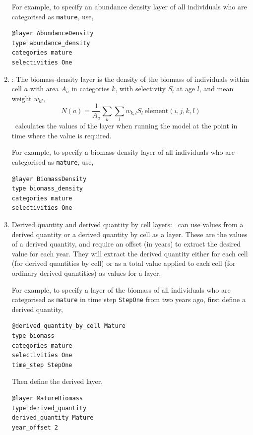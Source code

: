 \begin{enumerate}
For example, to specify an abundance density layer of all individuals who are categorised as \texttt{mature}, use,
{\small{\begin{verbatim}
@layer AbundanceDensity
type abundance_density
categories mature
selectivities One
\end{verbatim}}}

\item {}: The biomass-density layer is the density of the biomass of individuals within cell $a$ with area $A_a$ in categories $k$, with selectivity $S_l$ at age $l$, and mean weight $w_{kl}$,
\begin{equation}
  N(a) = \frac{1}{A_a} \sum\limits_{k} \sum\limits_l w_{k,l} S_l \ \text{element}(i,j,k,l)
\end{equation}
\SPM\ calculates the values of the layer when running the model at the point in time where the value is required.

For example, to specify a biomass density layer of all individuals who are categorised as \texttt{mature}, use,
{\small{\begin{verbatim}
@layer BiomassDensity
type biomass_density
categories mature
selectivities One
\end{verbatim}}}

\item {Derived quantity and derived quantity by cell layers}\label{derived quantity layer}: \SPM\ can use values from a derived quantity or a derived quantity by cell as a layer. These are the values of a derived quantity, and require an offset (in years) to extract the desired value for each year. They will extract the derived quantity either for each cell (for derived quantities by cell) or as a total value applied to each cell (for ordinary derived quantities) as values for a layer.

For example, to specify a layer of the biomass of all individuals who are categorised as \texttt{mature} in time step \texttt{StepOne} from two years ago, first define a derived quantity,
{\small{\begin{verbatim}
@derived_quantity_by_cell Mature
type biomass
categories mature
selectivities One
time_step StepOne
\end{verbatim}}}

Then define the derived layer,
{\small{\begin{verbatim}
@layer MatureBiomass
type derived_quantity
derived_quantity Mature
year_offset 2
\end{verbatim}}}


\end{enumerate}
